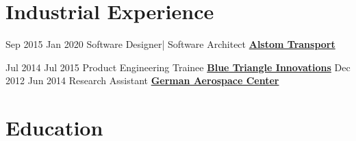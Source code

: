 \documentclass[letterpaper]{DS_class_file} %
\begin{document}
\section{\faCogs Industrial Experience}
\begin{twenty}
	\twentyitem
		{Sep 2015}
		{Jan 2020}
		{Software Designer| Software Architect}
		{\href{https://www.alstom.com/alstom-india}{\textbf{Alstom Transport}}}
		{}
		{ 
  
        }
	\twentyitem
		{Jul 2014}
		{Jul 2015}
		{Product Engineering Trainee}
		{\href{}{\textbf{Blue Triangle Innovations}}}
		{}
		{}
   \twentyitem
		{Dec 2012}
		{Jun 2014}
		{Research Assistant}
		{\href{}{\textbf{German Aerospace Center}}}
		{}
		{}
\end{twenty}
\section{\faGraduationCap Education}
\end{document}
